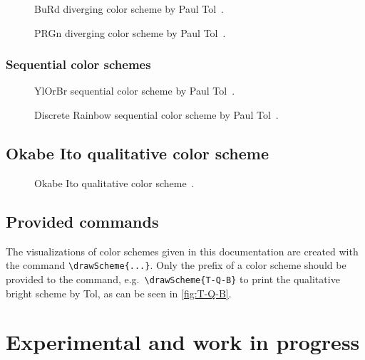 \documentclass{scrartcl}
\newcommand\marg[1]{\leavevmode\marginpar{\raggedleft #1}}
\begin{document}
\begin{figure}[ht]
    \centering
    \caption{BuRd diverging color scheme by Paul Tol~\cite{Tol}.}
    \label{fig:T-D-BR}
\end{figure}

\begin{figure}[ht]
    \centering
    \caption{PRGn diverging color scheme by Paul Tol~\cite{Tol}.}
    \label{fig:T-D-PG}
\end{figure}

\subsubsection{Sequential color schemes}

\begin{figure}[ht]
    \centering
    \caption{YlOrBr sequential color scheme by Paul Tol~\cite{Tol}.}
    \label{fig:T-S-YB}
\end{figure}

\begin{figure}[ht]
    \centering
    \caption{Discrete Rainbow sequential color scheme by Paul Tol~\cite{Tol}.}
    \label{fig:T-S-DR}
\end{figure}

\subsection{Okabe Ito qualitative color scheme}

\begin{figure}[ht]
    \centering
    \caption{Okabe Ito qualitative color scheme~\cite{Ichihara_2008}.}
    \label{fig:OI}
\end{figure}

\subsection{Provided commands}
\cprotect\marg{\verb!\drawScheme{...}!}%
The visualizations of color schemes given in this documentation are created with the command \verb!\drawScheme{...}!.
Only the prefix of a color scheme should be provided to the command, e.g.\ \verb!\drawScheme{T-Q-B}! to print the qualitative bright scheme by Tol, as can be seen in \cref{fig:T-Q-B}.


\section{Experimental and work in progress}
\end{document}
